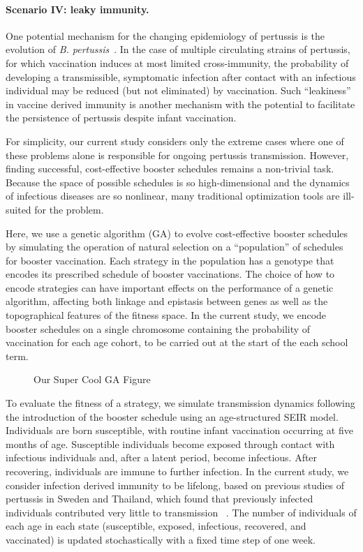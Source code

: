 \documentclass[12pt]{article}
\begin{document}
\paragraph{Scenario IV: leaky immunity.}
One potential mechanism for the changing epidemiology of pertussis
is the evolution of \textit{B. pertussis}~\cite{Mooi_et:2001}.
In the case of multiple  circulating strains of pertussis,
for which vaccination induces at most limited cross-immunity,
the probability of developing a transmissible, symptomatic infection
after contact with an infectious individual may be reduced (but not eliminated) by vaccination.
Such ``leakiness''~\cite{Halloran_et:1992} in vaccine derived immunity is another mechanism 
with the potential to facilitate the persistence of pertussis
despite infant vaccination.

For simplicity, our current study considers only the extreme cases 
where one of these problems alone is responsible for ongoing pertussis transmission.
However, finding successful, cost-effective booster schedules remains a non-trivial task. 
Because the space of possible schedules is 
so high-dimensional and the dynamics of infectious diseases are so nonlinear,
many traditional optimization tools are ill-suited for the problem.

Here, we use a genetic algorithm (GA) to evolve cost-effective booster schedules
by simulating the operation of natural selection on 
a ``population'' of schedules for booster vaccination.
Each strategy in the population has a genotype that encodes its
prescribed schedule of booster vaccinations.
The choice of how to encode strategies
can have important effects on the performance of a genetic algorithm, 
affecting both linkage and epistasis between genes
as well as the topographical features of the fitness space.
In the current study, we encode booster schedules on a
single chromosome containing the
probability of vaccination for each age cohort, to be
carried out at the start of the each school term.

\begin{figure}[h!]
\caption{Our Super Cool GA Figure }
\label{fig:GA}
\end{figure}


To evaluate the fitness of a strategy, we 
simulate transmission dynamics following the introduction
of the booster schedule using an age-structured SEIR model.
Individuals are born susceptible, with routine infant vaccination
occurring at five months of age.
Susceptible individuals become exposed through contact with
infectious individuals and, after a latent period, become infectious.
After recovering, individuals are immune to further infection. In the current study,
we consider infection derived immunity to be lifelong, based on
previous studies of pertussis in Sweden and Thailand, which 
found that previously infected individuals contributed very little to transmission
~\cite{Rohani_et:2010, Blackwood_et:2013}.
The number of individuals of each age in each state (susceptible, exposed, infectious,
recovered, and vaccinated) is updated stochastically with a fixed time step of one week.
\end{document}
